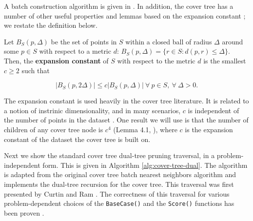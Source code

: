 A batch construction algorithm is given in \cite{langford2006}.  In addition,
the cover tree has a number of other useful properties and lemmas based on the
expansion constant \cite{karger2002finding}; we restate the definition below.

\begin{defn}
\label{def:int_dim}
Let $B_S(p, \Delta)$ be the set of points in $S$ within a closed ball of radius
$\Delta$ around some $p \in S$ with respect to a metric $d$:
%
$B_S(p, \Delta) = \{ r \in S \colon d(p, r) \leq \Delta \}$.
%
Then, the {\bf expansion constant} of $S$ with respect to the metric $d$ is the
smallest $c \ge 2$ such that

\vspace*{-0.8em}
\begin{equation}
| B_S(p, 2 \Delta) | \le c | B_S(p, \Delta) |\ \forall\ p \in S,\
\forall\ \Delta > 0.
\end{equation}
\vspace*{-1.4em}

\end{defn}

The expansion constant is used heavily in the cover tree literature.  It is
related to a notion of instrinic dimensionality, and in many scenarios, $c$ is
independent of the number of points in the dataset \cite{langford2006,
karger2002finding}.
One result we will use is that
the number of children of any cover tree node is $c^4$ (Lemma 4.1,
\cite{langford2006}), where $c$ is the expansion constant of the dataset the
cover tree is built on.



Next we show the standard cover tree dual-tree pruning traversal, in a
problem-independent form.  This is given in Algorithm \ref{alg:cover-tree-dual}.
The algorithm is adapted from the original cover tree batch nearest neighbors
algorithm \cite{langford2006} and implements the dual-tree recursion for the
cover tree.  This traversal was first presented by Curtin and Ram
\cite{curtin2014dual}.
%
The correctness of this
traversal for various problem-dependent choices of the \texttt{BaseCase()} and
the \texttt{Score()} functions has been proven \cite{curtin2013tree}.

